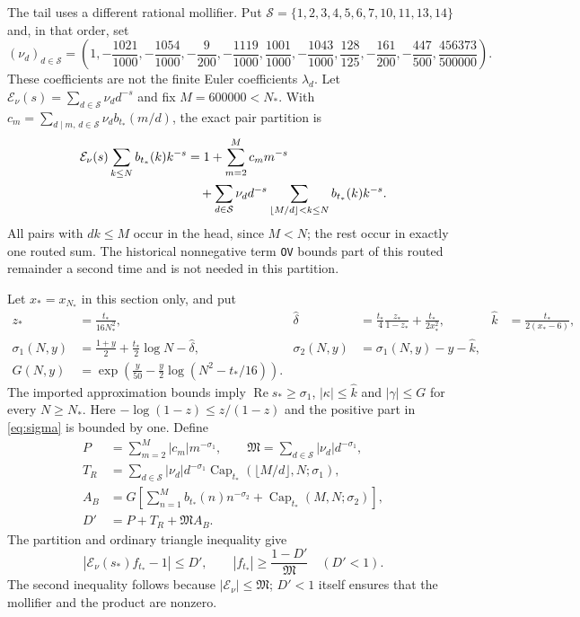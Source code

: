 \documentclass[11pt]{article}
\theoremstyle{remark}
\newcommand{\tstar}{t_*}
\newcommand{\Nstar}{N_*}
\DeclareMathOperator{\Rea}{Re}
\DeclareMathOperator{\Capbd}{Cap}
\numberwithin{equation}{section}
\begin{document}
The tail uses a different rational mollifier. Put
$\mathcal S=\{1,2,3,4,5,6,7,10,11,13,14\}$ and, in that order, set
\begin{equation}\label{eq:tailnu}
 (\nu_d)_{d\in\mathcal S}=
 \left(1,-\frac{1021}{1000},-\frac{1054}{1000},-\frac9{200},
 -\frac{1119}{1000},\frac{1001}{1000},-\frac{1043}{1000},
 \frac{128}{125},-\frac{161}{200},-\frac{447}{500},
 \frac{456373}{500000}\right).
\end{equation}
These coefficients are not the finite Euler coefficients $\lambda_d$.
Let $\mathcal E_\nu(s)=\sum_{d\in\mathcal S}\nu_dd^{-s}$ and fix
$M=600000<\Nstar$. With $c_m=\sum_{d\mid m,\,d\in\mathcal S}
\nu_db_{\tstar}(m/d)$, the exact pair partition is
\begin{align}\label{eq:partition}
 \mathcal E_\nu(s)\sum_{k\le N}b_{\tstar}(k)k^{-s}
 &=1+\sum_{m=2}^M c_mm^{-s}\\
 &\quad+\sum_{d\in\mathcal S}\nu_dd^{-s}
     \sum_{\lfloor M/d\rfloor<k\le N}b_{\tstar}(k)k^{-s}.\notag
\end{align}
All pairs with $dk\le M$ occur in the head, since $M<N$; the rest
occur in exactly one routed sum. The historical nonnegative term
\texttt{OV} bounds part of this routed remainder a second time and is
not needed in this partition.

Let $x_*=x_{\Nstar}$ in this section only, and put
\begin{align}
 z_*&=\frac{\tstar}{16\Nstar^2},&
 \widehat\delta&=\frac{\tstar}{4}\frac{z_*}{1-z_*}
                          +\frac{\tstar}{2x_*^2},&
 \widehat k&=\frac{\tstar}{2(x_*-6)},\label{eq:tailfreeze}\\
 \sigma_1(N,y)&=\frac{1+y}{2}+\frac{\tstar}{2}\log N-\widehat\delta,
 &\sigma_2(N,y)&=\sigma_1(N,y)-y-\widehat k,\label{eq:sig12}\\
 G(N,y)&=\exp\!\left(\frac y{50}-\frac y2\log(N^2-\tstar/16)\right).
 &&\label{eq:tailG}
\end{align}
The imported approximation bounds imply $\Rea s_*\ge\sigma_1$,
$|\kappa|\le\widehat k$ and $|\gamma|\le G$ for every $N\ge\Nstar$.
Here $-\log(1-z)\le z/(1-z)$ and the positive part in
\eqref{eq:sigma} is bounded by one. Define
\begin{align}
 P&=\sum_{m=2}^M|c_m|m^{-\sigma_1},\qquad
 \mathfrak M=\sum_{d\in\mathcal S}|\nu_d|d^{-\sigma_1},\label{eq:Ptail}\\
 T_R&=\sum_{d\in\mathcal S}|\nu_d|d^{-\sigma_1}
       \Capbd_{\tstar}(\lfloor M/d\rfloor,N;\sigma_1),\label{eq:TR}\\
 A_B&=G\left[\sum_{n=1}^M b_{\tstar}(n)n^{-\sigma_2}
                  +\Capbd_{\tstar}(M,N;\sigma_2)\right],\label{eq:AB}\\
 D'&=P+T_R+\mathfrak M A_B.\label{eq:Dprime}
\end{align}
The partition and ordinary triangle inequality give
\begin{equation}\label{eq:tailbinding}
 |\mathcal E_\nu(s_*)f_{\tstar}-1|\le D',\qquad
 |f_{\tstar}|\ge\frac{1-D'}{\mathfrak M}\quad(D'<1).
\end{equation}
The second inequality follows because $|\mathcal E_\nu|\le\mathfrak M$;
$D'<1$ itself ensures that the mollifier and the product are nonzero.
\end{document}
